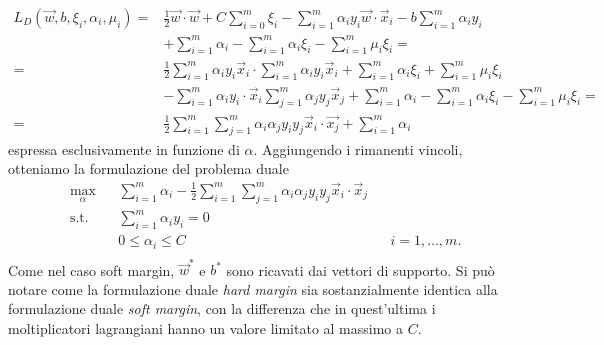 \begin{equation}
\begin{split}
L_D(\Vec{w},b, \xi_i, \alpha_i, \mu_i) = & \frac{1}{2}\Vec{w}\cdot\Vec{w} + C\sum_{i=0}^{m} \xi_i - \sum_{i=1}^{m} \alpha_i y_i \Vec{w}\cdot \Vec{x}_i - b \sum_{i=1}^{m} \alpha_i y_i \\ & + \sum_{i=1}^{m} \alpha_i - \sum_{i=1}^{m} \alpha_i\xi_i - \sum_{i=1}^{m}\mu_i\xi_i =\\
= & \frac{1}{2}\sum_{i=1}^{m}\alpha_iy_i\Vec{x}_i \cdot \sum_{i=1}^{m}\alpha_iy_i\Vec{x}_i  + \sum_{i=1}^{m}\alpha_i\xi_i + \sum_{i=1}^{m}\mu_i\xi_i \\
& - \sum_{i=1}^{m} \alpha_i y_i  \cdot \Vec{x}_i \sum_{j=1}^{m}\alpha_jy_j\Vec{x}_j + \sum_{i=1}^{m} \alpha_i - \sum_{i=1}^{m} \alpha_i\xi_i - \sum_{i=1}^{m}\mu_i\xi_i =\\
=& \frac{1}{2}\sum_{i=1}^{m}\sum_{j=1}^{m}\alpha_i\alpha_jy_iy_j\Vec{x}_i\cdot\Vec{x_j} + \sum_{i=1}^{m} \alpha_i
\end{split}  
\end{equation}
espressa esclusivamente in funzione di $\alpha$.
Aggiungendo i rimanenti vincoli, otteniamo la formulazione del problema duale
\begin{equation}\label{eq:svc:softmargin:wolfe_dual}
\begin{aligned}
& \max_{\alpha}    && \sum_{i=1}^{m}\alpha_i - \frac{1}{2}\sum_{i=1}^{m}\sum_{j=1}^{m}\alpha_i\alpha_jy_iy_j\Vec{x}_i\cdot\Vec{x}_j\\
& \textrm{s.t.} && \sum_{i=1}^{m} \alpha_iy_i = 0 \\
&               && 0 \leq \alpha_i \leq C && i=1,\dots,m. \\
\end{aligned}
\end{equation}
Come nel caso soft margin, $\Vec{w}^*$ e $b^*$ sono ricavati dai vettori di supporto.
Si può notare come la formulazione duale \emph{hard margin} sia sostanzialmente identica alla formulazione duale \emph{soft margin}, con la differenza che in quest'ultima i moltiplicatori lagrangiani hanno un valore limitato al massimo a $C$.




